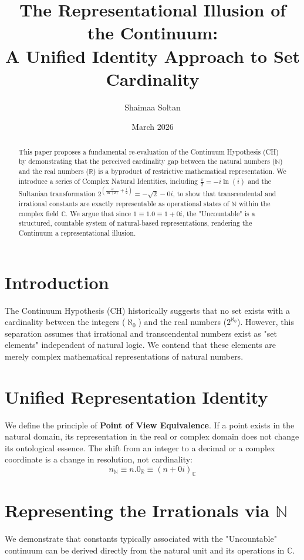 \documentclass[12pt,a4paper]{article}
\title{The Representational Illusion of the Continuum: \\ A Unified Identity Approach to Set Cardinality}
\author{Shaimaa Soltan}
\date{March 2026}
\begin{document}
\maketitle

\begin{abstract}
This paper proposes a fundamental re-evaluation of the Continuum Hypothesis (CH) by demonstrating that the perceived cardinality gap between the natural numbers ($\mathbb{N}$) and the real numbers ($\mathbb{R}$) is a byproduct of restrictive mathematical representation. We introduce a series of Complex Natural Identities, including $\frac{\pi}{2} = -i \ln(i)$ and the Sultanian transformation $2^{(\frac{i\pi}{\ln(2)} + \frac{1}{2})} = -\sqrt{2}-0i$, to show that transcendental and irrational constants are exactly representable as operational states of $\mathbb{N}$ within the complex field $\mathbb{C}$. We argue that since $1 \equiv 1.0 \equiv 1+0i$, the "Uncountable" is a structured, countable system of natural-based representations, rendering the Continuum a representational illusion.
\end{abstract}

\section{Introduction}
The Continuum Hypothesis (CH) historically suggests that no set exists with a cardinality between the integers ($\aleph_0$) and the real numbers ($2^{\aleph_0}$). However, this separation assumes that irrational and transcendental numbers exist as "set elements" independent of natural logic. We contend that these elements are merely complex mathematical representations of natural numbers.

\section{Unified Representation Identity}
We define the principle of \textbf{Point of View Equivalence}. If a point exists in the natural domain, its representation in the real or complex domain does not change its ontological essence. The shift from an integer to a decimal or a complex coordinate is a change in resolution, not cardinality:
\begin{equation}
    n_{\mathbb{N}} \equiv n.0_{\mathbb{R}} \equiv (n + 0i)_{\mathbb{C}}
\end{equation}

\section{Representing the Irrationals via $\mathbb{N}$}
We demonstrate that constants typically associated with the "Uncountable" continuum can be derived directly from the natural unit and its operations in $\mathbb{C}$.
\end{document}
